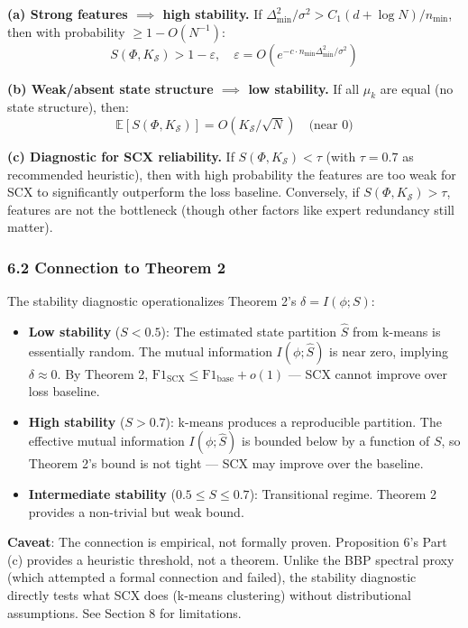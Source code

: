 \documentclass[
  12pt,
]{ctexart}
\providecommand{\tightlist}{%
  \setlength{\itemsep}{0pt}\setlength{\parskip}{0pt}}
\begin{document}
\textbf{(a) Strong features \(\implies\) high stability.} If
\(\Delta_{\min}^2/\sigma^2 > C_1(d + \log N)/n_{\min}\), then with
probability \(\geq 1 - O(N^{-1})\):
\[S(\Phi, K_{\mathcal{S}}) > 1 - \varepsilon, \quad \varepsilon = O(e^{-c \cdot n_{\min} \Delta_{\min}^2/\sigma^2})\]

\textbf{(b) Weak/absent state structure \(\implies\) low stability.} If
all \(\mu_k\) are equal (no state structure), then:
\[\mathbb{E}[S(\Phi, K_{\mathcal{S}})] = O(K_{\mathcal{S}}/\sqrt{N}) \quad \text{(near 0)}\]

\textbf{(c) Diagnostic for SCX reliability.} If
\(S(\Phi, K_{\mathcal{S}}) < \tau\) (with \(\tau = 0.7\) as recommended
heuristic), then with high probability the features are too weak for SCX
to significantly outperform the loss baseline. Conversely, if
\(S(\Phi, K_{\mathcal{S}}) > \tau\), features are not the bottleneck
(though other factors like expert redundancy still matter).

\subsubsection{6.2 Connection to Theorem
2}\label{connection-to-theorem-2}

The stability diagnostic operationalizes Theorem 2's
\(\delta = I(\phi; S)\):

\begin{itemize}
\tightlist
\item
  \textbf{Low stability} (\(S < 0.5\)): The estimated state partition
  \(\hat{S}\) from k-means is essentially random. The mutual information
  \(I(\phi; \hat{S})\) is near zero, implying \(\delta \approx 0\). By
  Theorem 2,
  \(\text{F1}_{\text{SCX}} \leq \text{F1}_{\text{base}} + o(1)\) --- SCX
  cannot improve over loss baseline.
\item
  \textbf{High stability} (\(S > 0.7\)): k-means produces a reproducible
  partition. The effective mutual information \(I(\phi; \hat{S})\) is
  bounded below by a function of \(S\), so Theorem 2's bound is not
  tight --- SCX may improve over the baseline.
\item
  \textbf{Intermediate stability} (\(0.5 \leq S \leq 0.7\)):
  Transitional regime. Theorem 2 provides a non-trivial but weak bound.
\end{itemize}

\textbf{Caveat}: The connection is empirical, not formally proven.
Proposition 6's Part (c) provides a heuristic threshold, not a theorem.
Unlike the BBP spectral proxy (which attempted a formal connection and
failed), the stability diagnostic directly tests what SCX does (k-means
clustering) without distributional assumptions. See Section 8 for
limitations.
\end{document}
